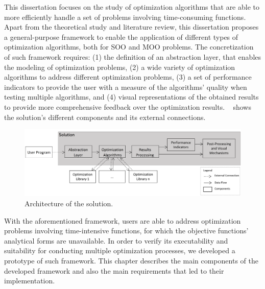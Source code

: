 \label{chap:architecture}

This dissertation focuses on the study of optimization algorithms that are able to more efficiently handle a set of problems involving time-consuming functions. Apart from the theoretical study and literature review, this dissertation proposes a general-purpose framework to enable the application of different types of optimization algorithms, both for \ac{SOO} and \ac{MOO} problems. The concretization of such framework requires: (1) the definition of an abstraction layer, that enables the modeling of optimization problems, (2) a wide variety of optimization algorithms to address different optimization problems, (3) a set of performance indicators to provide the user with a measure of the algorithms' quality when testing multiple algorithms, and (4) visual representations of the obtained results to provide more comprehensive feedback over the optimization results. ~ shows the  solution's different components and its external connections.

\begin{figure}[htbp]
	\centering
	\includegraphics[width=\textwidth]{./Images/Solution/solution_architecture_2.PNG}
	\caption{Architecture of the solution.}
	\label{fig:solution}
\end{figure}

With the aforementioned framework, users are able to address optimization problems involving time-intensive functions, for which the objective functions' analytical forms are unavailable. In order to verify its executability and suitability for conducting multiple optimization processes, we developed a prototype of such framework. This chapter describes the main components of the developed framework and also the main requirements that led to their implementation. 


